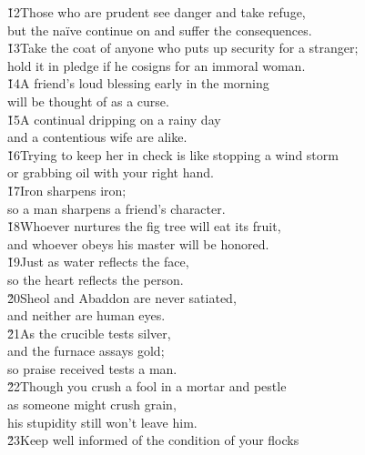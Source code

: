 \begin{poetry}
\poeml \v{12}Those who are prudent see danger and take refuge, \\
\poemll    but the na\"{i}ve continue on and suffer the consequences. \\
\poeml \v{13}Take the coat of anyone who puts up security for a stranger; \\
\poemll    hold it in pledge if he cosigns for an immoral woman. \\
\poeml \v{14}A friend's loud blessing early in the morning \\
\poemll    will be thought of as a curse. \\
\poeml \v{15}A continual dripping on a rainy day \\
\poemll    and a contentious wife are alike. \\
\poeml \v{16}Trying to keep her in check is like stopping a wind storm \\
\poemll    or grabbing oil with your right hand. \\
\poeml \v{17}Iron sharpens iron; \\
\poemll    so a man sharpens a friend's character. \\
\poeml \v{18}Whoever nurtures the fig tree will eat its fruit, \\
\poemll    and whoever obeys his master will be honored. \\
\poeml \v{19}Just as water reflects the face, \\
\poemll    so the heart reflects the person. \\
\poeml \v{20}Sheol and Abaddon are never satiated, \\
\poemll    and neither are human eyes. \\
\poeml \v{21}As the crucible tests silver, \\
\poemll    and the furnace assays gold; \\
\poemlll       so praise received tests a man. \\
\poeml \v{22}Though you crush a fool in a mortar and pestle \\
\poemll    as someone might crush grain, \\
\poemlll       his stupidity still won't leave him. \\
\poeml \v{23}Keep well informed of the condition of your flocks \\

\end{poetry}
